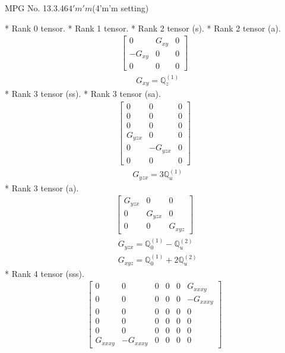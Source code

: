 \documentclass[fleqn,8pt,landscape]{jsarticle}
\begin{document}
\setcounter{MaxMatrixCols}{32}

\renewcommand{\tablename}{Table~}
\renewcommand{\figurename}{Figure~}
\begin{center}
\LARGE
MPG No. 13.3.46\quad$4'm'm$\quad(4'm'm setting)
\end{center}
* Rank 0 tensor.
* Rank 1 tensor.
* Rank 2 tensor (s).
* Rank 2 tensor (a).
\begin{align*}
\begin{bmatrix} 0 & G_{xy} & 0 \\ - G_{xy} & 0 & 0 \\ 0 & 0 & 0 \end{bmatrix}
\end{align*}
\begin{align*}
& G_{xy} = \mathbb{Q}_{z}^{(1)}
\end{align*}
* Rank 3 tensor (ss).
* Rank 3 tensor (sa).
\begin{align*}
\begin{bmatrix} 0 & 0 & 0 \\ 0 & 0 & 0 \\ 0 & 0 & 0 \\ G_{yzx} & 0 & 0 \\ 0 & - G_{yzx} & 0 \\ 0 & 0 & 0 \end{bmatrix}
\end{align*}
\begin{align*}
& G_{yzx} = 3 \mathbb{Q}_{u}^{(1)}
\end{align*}
* Rank 3 tensor (a).
\begin{align*}
\begin{bmatrix} G_{yzx} & 0 & 0 \\ 0 & G_{yzx} & 0 \\ 0 & 0 & G_{xyz} \end{bmatrix}
\end{align*}
\begin{align*}
& G_{yzx} = \mathbb{Q}_{0}^{(1)} - \mathbb{Q}_{u}^{(2)} \\
& G_{xyz} = \mathbb{Q}_{0}^{(1)} + 2 \mathbb{Q}_{u}^{(2)}
\end{align*}
* Rank 4 tensor (sss).
\begin{align*}
\begin{bmatrix} 0 & 0 & 0 & 0 & 0 & G_{xxxy} \\ 0 & 0 & 0 & 0 & 0 & - G_{xxxy} \\ 0 & 0 & 0 & 0 & 0 & 0 \\ 0 & 0 & 0 & 0 & 0 & 0 \\ 0 & 0 & 0 & 0 & 0 & 0 \\ G_{xxxy} & - G_{xxxy} & 0 & 0 & 0 & 0 \end{bmatrix}
\end{align*}
\end{document}

